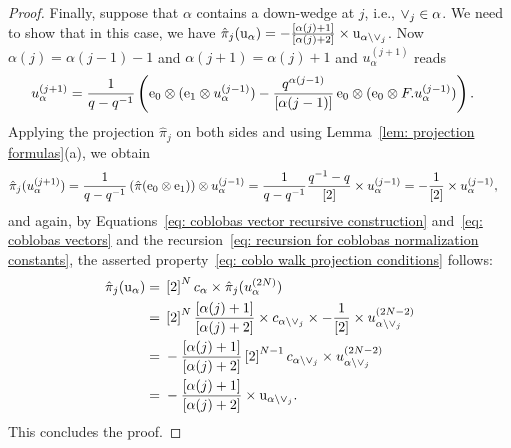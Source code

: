\documentclass[oneside,english]{amsart}
\numberwithin{equation}{section}
\numberwithin{figure}{section}
\theoremstyle{plain}
\theoremstyle{plain}
\theoremstyle{plain}
\theoremstyle{remark}
\theoremstyle{plain}
\theoremstyle{plain}
\theoremstyle{plain}
\theoremstyle{plain}
\theoremstyle{plain}
\theoremstyle{plain}
\theoremstyle{plain}
\theoremstyle{plain}
\begin{document}
\begin{proof}
Finally, suppose that $\alpha$ contains a down-wedge 
at $j$, i.e., $\vee_j \in \alpha$.
We need to show that in this case, we have 
$\hat{\pi}_j(\mathrm{u}_\alpha) =
-\frac{\left[\alpha(j)+1\right]}{\left[\alpha(j)+2\right]} \times \mathrm{u}_{\alpha\setminus \vee_j}$. 
Now $\alpha(j) = \alpha(j-1)-1$ and $\alpha(j+1) = \alpha(j)+1$
and $u_\alpha^{(j+1)}$ reads
\begin{align*}
u_\alpha^{(j+1)} 
= \; & \frac{1}{q-q^{-1}} \left( 
\mathrm{e}_0 \otimes (\mathrm{e}_1 \otimes u_\alpha^{(j-1)})
- \frac{q^{\alpha(j-1)}}{\left[\alpha(j-1)\right]}\,\mathrm{e}_0 \otimes (\mathrm{e}_0 \otimes F.u_\alpha^{(j-1)}) 
\right).
\end{align*}
Applying the projection $\hat{\pi}_j$ on both sides and using
Lemma~\ref{lem: projection formulas}(a), we obtain
\begin{align*}
\hat{\pi}_j ( u_\alpha^{(j+1)} )
= \; & \frac{1}{q-q^{-1}} \left( 
\hat{\pi} (\mathrm{e}_0 \otimes \mathrm{e}_1) \right) \otimes u_\alpha^{(j-1)} 
= \frac{1}{q-q^{-1}} \frac{q^{-1}-q}{\left[2\right]} \times u_\alpha^{(j-1)}
= - \frac{1}{\left[2\right]} \times u_\alpha^{(j-1)},
\end{align*}
and again, by Equations~\eqref{eq: coblobas vector recursive construction} 
and~\eqref{eq: coblobas vectors} 
and the %
recursion~\eqref{eq: recursion for coblobas normalization constants}, the asserted
property~\eqref{eq: coblo walk projection conditions} follows:
\begin{align*}
\hat{\pi}_j ( \mathrm{u}_\alpha ) 
= \; & \left[2\right]^N c_\alpha \times 
\hat{\pi}_j ( u_{\alpha}^{(2N)} ) \\
= \; & \left[2\right]^N \frac{\left[\alpha(j)+1\right]}{\left[\alpha(j)+2\right]}  \times
c_{\alpha\setminus \vee_j} \times 
- \frac{1}{\left[2\right]} 
\times u_{\alpha \setminus \vee_j}^{(2N-2)} \\
= \; & - \frac{\left[\alpha(j)+1\right]}{\left[\alpha(j)+2\right]} 
\left[2\right]^{N-1} c_{\alpha\setminus \vee_j} \times 
u_{\alpha \setminus \vee_j}^{(2N-2)} \\
= \; & - \frac{\left[\alpha(j)+1\right]}{\left[\alpha(j)+2\right]} 
\times \mathrm{u}_{\alpha \setminus \vee_j}.
\end{align*}
This concludes the proof.
\end{proof}
\end{document}
